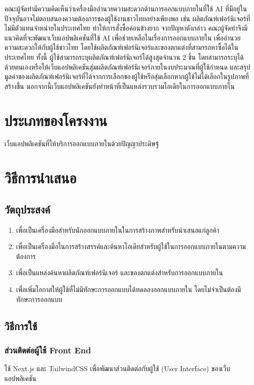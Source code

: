 \documentclass[12pt,oneside,openright,a4paper]{cpe-thai-project}
\begin{document}
\par  \hspace {18pt}
คณะผู้จัดทำมีความคิดเห็นว่าเครื่องมืออำนวยความสะดวกด้านการออกแบบภายในที่ใช้ AI ที่มีอยู่ในปัจจุบันอาจไม่ตอบสนองความต้องการของผู้ใช้งานชาวไทยอย่างเพียงพอ เช่น ผลิตภัณฑ์เฟอร์นิเจอร์ที่ไม่มีตัวแทนจำหน่ายในประเทศไทย ทำให้การสั่งซื้อค่อนข้างยาก จากปัญหาดังกล่าว คณะผู้จัดทำจึงมีแนวคิดที่จะพัฒนาเว็บแอปพลิเคชันที่ใช้ AI เพื่อช่วยเหลือในเรื่องการออกแบบภายใน เพื่ออำนวยความสะดวกให้กับผู้ใช้ชาวไทย โดยใช้ผลิตภัณฑ์เฟอร์นิเจอร์และของตกแต่งที่สามารถหาซื้อได้ในประเทศไทย ทั้งนี้ ผู้ใช้สามารถระบุผลิตภัณฑ์เฟอร์นิเจอร์ได้สูงสุดจำนวน 2 ชิ้น โดยสามารถระบุได้ด้วยตนเองหรือให้เว็บแอปพลิเคชันสุ่มผลิตภัณฑ์เฟอร์นิเจอร์ภายในงบประมาณที่ผู้ใช้กำหนด และสรุปมูลค่าของผลิตภัณฑ์เฟอร์นิเจอร์ที่ได้จากการเลือกของผู้ใช้หรือสุ่มเลือกหากผู้ใช้ไม่ได้เลือกในรูปภาพที่สร้างขึ้น นอกจากนี้เว็บแอปพลิเคชันยังทำหน้าที่เป็นแหล่งรวบรวมไอเดียในการออกแบบภายใน

\section{ประเภทของโครงงาน}
เว็บแอปพลิเคชันที่ให้บริการออกแบบภายในด้วยปัญญาประดิษฐ์

\section{วิธีการนำเสนอ}

\subsection{วัตถุประสงค์}
\begin{enumerate}
  \item เพื่อเป็นเครื่องมือสำหรับนักออกแบบภายในในการสร้างภาพสำหรับนำเสนอแก่ลูกค้า
  \item เพื่อเป็นเครื่องมือในการสร้างสรรค์และค้นหาไอเดียสำหรับผู้ใช้ในการออกแบบภายในตามความต้องการ
  \item เพื่อเป็นแหล่งค้นหาผลิตภัณฑ์เฟอร์นิเจอร์ และของตกแต่งสำหรับการออกแบบภายใน
  \item เพื่อเพิ่มโอกาสให้ผู้ใช้ที่ไม่มีทักษะการออกแบบได้ทดลองออกแบบภายใน โดยไม่จำเป็นต้องมีทักษะการออกแบบ
\end{enumerate}

\subsection{วิธีการใช้}
\subsubsection{ส่วนติดต่อผู้ใช้ Front End}
\hspace{18pt}ใช้ Next.js และ TailwindCSS เพื่อพัฒนาส่วนติดต่อกับผู้ใช้ (User Interface) ของเว็บแอปพลิเคชัน
\end{document}
